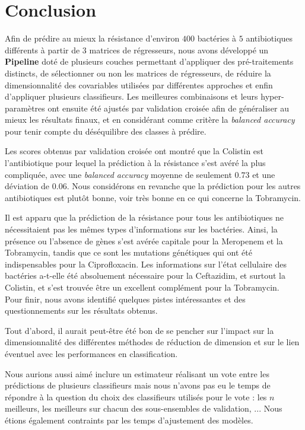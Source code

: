 \documentclass[11pt]{article}
\begin{document}
\hypertarget{conclusion}{%
\section{Conclusion}\label{conclusion}}

  Afin de prédire au mieux la résistance d'environ $400$ bactéries à $5$ antibiotiques différents à partir de $3$ matrices de régresseurs, nous avons développé un \textbf{Pipeline} doté de plusieurs couches permettant d'appliquer des pré-traitements distincts, de sélectionner ou non les matrices de régresseurs, de réduire la dimensionnalité des covariables utilisées par différentes approches et enfin d'appliquer plusieurs classifieurs.
  Les meilleures combinaisons et leurs hyper-paramètres ont ensuite été ajustés par validation croisée afin de généraliser au mieux les résultats finaux, et en considérant comme critère la \textit{balanced accuracy} pour tenir compte du déséquilibre des classes à prédire.

  Les scores obtenus par validation croisée ont montré que la Colistin est l'antibiotique pour lequel la prédiction à la résistance s'est avéré la plus compliquée, avec une \textit{balanced accuracy} moyenne de seulement $0.73$ et une déviation de $0.06$.
  Nous considérons en revanche que la prédiction pour les autres antibiotiques est plutôt bonne, voir très bonne en ce qui concerne la Tobramycin.

  Il est apparu que la prédiction de la résistance pour tous les antibiotiques ne nécessitaient pas les mêmes types d'informations sur les bactéries.
  Ainsi, la présence ou l'absence de gènes s'est avérée capitale pour la Meropenem et la Tobramycin, tandis que ce sont les mutations génétiques qui ont été indispensables pour la Ciprofloxacin.
  Les informations sur l'état cellulaire  des bactéries a-t-elle été absoluement nécessaire pour la Ceftazidim, et surtout la Colistin, et s'est trouvée être un excellent complément pour la Tobramycin. \\

  Pour finir, nous avons identifié quelques pistes intéressantes et des questionnements sur les résultats obtenus.

  Tout d'abord, il aurait peut-être été bon de se pencher sur l'impact sur la dimensionnalité des différentes méthodes de réduction de dimension et sur le lien éventuel avec les performances en classification.

  Nous aurions aussi aimé inclure un estimateur réalisant un vote entre les prédictions de plusieurs classifieurs mais nous n'avons pas eu le temps de répondre à la question du choix des classifieurs utilisés pour le vote : les $n$ meilleurs, les meilleurs sur chacun des sous-ensembles de validation, ...
  Nous étions également contraints par les temps d'ajustement des modèles.
\end{document}
